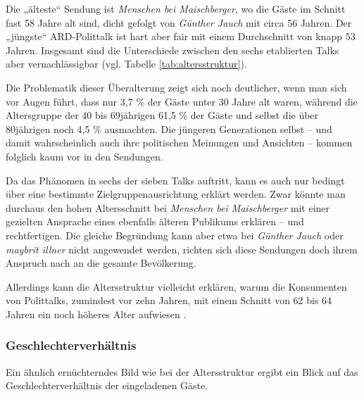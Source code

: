 Die „älteste“ Sendung ist \textit{Menschen bei Maischberger}, wo die Gäste im Schnitt fast 58 Jahre alt sind, dicht gefolgt von\textit{ Günther Jauch} mit circa 56 Jahren. Der „jüngste“ ARD-Polittalk ist hart aber fair mit einem Durchschnitt von knapp 53 Jahren. Insgesamt sind die Unterschiede zwischen den sechs etablierten Talks aber vernachlässigbar (vgl. Tabelle \vref{tab:altersstruktur}).

Die Problematik dieser Überalterung zeigt sich noch deutlicher, wenn man sich vor Augen führt, dass nur 3,7 \% der Gäste unter 30 Jahre alt waren, während die Altersgruppe der 40 bis 69jährigen 61,5 \% der Gäste und selbst die über 80jährigen noch 4,5 \% ausmachten. Die jüngeren Generationen selbst – und damit wahrscheinlich auch ihre politischen Meinungen und Ansichten – kommen folglich kaum vor in den Sendungen.

Da das Phänomen in sechs der sieben Talks auftritt, kann es auch nur bedingt über eine bestimmte Zielgruppenausrichtung erklärt werden. Zwar könnte man durchaus den hohen Altersschnitt bei \textit{Menschen bei Maischberger} mit einer gezielten Ansprache eines ebenfalls älteren Publikums erklären – und rechtfertigen. Die gleiche Begründung kann aber etwa bei \textit{Günther Jauch} oder \textit{maybrit illner} nicht angewendet werden, richten sich diese Sendungen doch ihrem Anspruch nach an die gesamte Bevölkerung.

Allerdings kann die Altersstruktur vielleicht erklären, warum die Konsumenten von Polittalks, zumindest vor zehn Jahren, mit einem Schnitt von 62 bis 64 Jahren ein noch höheres Alter aufwiesen \parencite[309f.]{gerhardsTalkshownutzungUndTalkshownutzer2002}.

\subsubsection{Geschlechterverhältnis}

Ein ähnlich ernüchterndes Bild wie bei der Altersstruktur ergibt ein Blick auf das Geschlechterverhältnis der eingeladenen Gäste.

